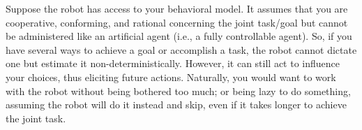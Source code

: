 \documentclass[letterpaper]{article} %
\begin{document}
Suppose the robot has access to your behavioral model. It assumes that you are cooperative, conforming, and rational concerning the joint task/goal but cannot be administered like an artificial agent (i.e., a fully controllable agent). 
So, if you have several ways to achieve a goal or accomplish a task, the robot cannot dictate one but estimate it non-deterministically. However, it can still act to influence your choices, thus eliciting future actions. Naturally, you would want to work with the robot without being bothered too much; or being lazy to do something, assuming the robot will do it instead and skip, even if it takes longer to achieve the joint task. 

\end{document}
